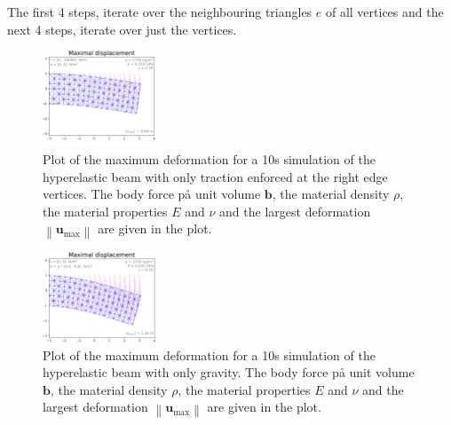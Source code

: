\documentclass[acmtog]{acmart}
\begin{document}
The first 4 steps, iterate over the neighbouring triangles  $e$ of all vertices and the next 4 steps, iterate over just the vertices.

\begin{figure}
  \centering
  \includegraphics[width=0.3\textwidth]{Images/elastic_cantilever_traction.png}
  \caption{Plot of the maximum deformation for a 10s simulation of the hyperelastic beam with only traction enforced at the right edge vertices. The body force på unit volume $\boldsymbol b$, the material density $\rho$, the material properties $E$ and $\nu$ and the largest deformation $\left\lVert \boldsymbol u_\mathrm{max}  \right\rVert $ are given in the plot.\label{fig:elastic_cantilever_traction}}
\end{figure}

\begin{figure}
  \centering
  \includegraphics[width=0.3\textwidth]{Images/elastic_cantilever_gravity.png}
  \caption{Plot of the maximum deformation for a 10s simulation of the hyperelastic beam with only gravity. The body force på unit volume $\boldsymbol b$, the material density $\rho$, the material properties $E$ and $\nu$ and the largest deformation $\left\lVert \boldsymbol u_\mathrm{max}  \right\rVert $ are given in the plot.\label{fig:elastic_cantilever_gravity}}
\end{figure}
\end{document}
